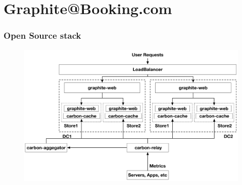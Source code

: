 \documentclass[aspectratio=43, unicode, notheorems, xcolor={dvipsnames}]{beamer}
\begin{document}
\section{Graphite@Booking.com}
\begin{frame}
	\frametitle{Open Source stack}
\begin{figure}[h]
\begin{center}
	\includegraphics[width=1.05\columnwidth]{graphite-oss}
\end{center}
\end{figure}
\end{frame}
\end{document}

